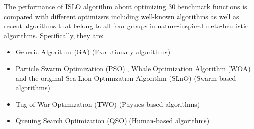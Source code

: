 \documentclass[a4paper,13pt,2p]{report}
\begin{document}
The performance of ISLO algorithm about optimizing 30 benchmark functions is compared with different optimizers including well-known algorithms as well as recent algorithms that belong to all four groups in nature-inspired meta-heuristic algorithms. Specifically, they are: 
\begin{itemize}
\item Generic Algorithm (GA) \cite{whitley1994genetic} (Evolutionary algorithms)
\item Particle Swarm Optimization (PSO) \cite{kennedy2010particle}, Whale Optimization Algorithm (WOA) \cite{mirjalili2016whale} and the original Sea Lion Optimization Algorithm (SLnO) \cite{masadeh2019sea} (Swarm-based algorithms)
\item Tug of War Optimization (TWO) \cite{kaveh2016novel} (Physics-based algorithms)
\item Queuing Search Optimization (QSO) \cite{zhang2018queuing} (Human-based algorithms)
\end{itemize}
\end{document}

